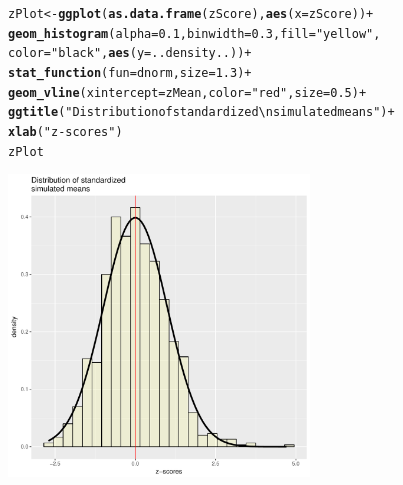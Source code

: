 \documentclass[a4paper, 12pt]{article}\usepackage[]{graphicx}\usepackage[]{color}
\makeatletter
\newcommand{\hlnum}[1]{\textcolor[rgb]{0.686,0.059,0.569}{#1}}%
\newcommand{\hlstr}[1]{\textcolor[rgb]{0.192,0.494,0.8}{#1}}%
\newcommand{\hlopt}[1]{\textcolor[rgb]{0,0,0}{#1}}%
\newcommand{\hlstd}[1]{\textcolor[rgb]{0.345,0.345,0.345}{#1}}%
\newcommand{\hlkwb}[1]{\textcolor[rgb]{0.69,0.353,0.396}{#1}}%
\newcommand{\hlkwc}[1]{\textcolor[rgb]{0.333,0.667,0.333}{#1}}%
\newcommand{\hlkwd}[1]{\textcolor[rgb]{0.737,0.353,0.396}{\textbf{#1}}}%
\newenvironment{kframe}{%
 \def\at@end@of@kframe{}%
 \ifinner\ifhmode%
  \def\at@end@of@kframe{\end{minipage}}%
  \begin{minipage}{\columnwidth}%
 \fi\fi%
 \def\FrameCommand##1{\hskip\@totalleftmargin \hskip-\fboxsep
 \colorbox{shadecolor}{##1}\hskip-\fboxsep
     \hskip-\linewidth \hskip-\@totalleftmargin \hskip\columnwidth}%
 \MakeFramed {\advance\hsize-\width
   \@totalleftmargin\z@ \linewidth\hsize
   \@setminipage}}%
 {\par\unskip\endMakeFramed%
 \at@end@of@kframe}
\newenvironment{knitrout}{}{} %
\makeatother
\begin{document}
\begin{knitrout}
\color{fgcolor}\begin{kframe}
\begin{alltt}
\hlstd{zPlot} \hlkwb{<-} \hlkwd{ggplot}\hlstd{(}\hlkwd{as.data.frame}\hlstd{(zScore),} \hlkwd{aes}\hlstd{(}\hlkwc{x} \hlstd{= zScore))} \hlopt{+}
   \hlkwd{geom_histogram}\hlstd{(}\hlkwc{alpha}\hlstd{=}\hlnum{0.1}\hlstd{,}  \hlkwc{binwidth} \hlstd{=} \hlnum{0.3}\hlstd{,} \hlkwc{fill}\hlstd{=}\hlstr{"yellow"}\hlstd{,}
                  \hlkwc{color}\hlstd{=}\hlstr{"black"}\hlstd{,} \hlkwd{aes}\hlstd{(}\hlkwc{y} \hlstd{= ..density..))} \hlopt{+}
   \hlkwd{stat_function}\hlstd{(}\hlkwc{fun} \hlstd{= dnorm,} \hlkwc{size} \hlstd{=} \hlnum{1.3}\hlstd{)} \hlopt{+}
   \hlkwd{geom_vline}\hlstd{(}\hlkwc{xintercept} \hlstd{= zMean,} \hlkwc{color}\hlstd{=}\hlstr{"red"}\hlstd{,} \hlkwc{size} \hlstd{=} \hlnum{0.5}\hlstd{)} \hlopt{+}
   \hlkwd{ggtitle}\hlstd{(}\hlstr{"Distribution of standardized \textbackslash{}nsimulated means"}\hlstd{)} \hlopt{+}
   \hlkwd{xlab}\hlstd{(}\hlstr{"z-scores"}\hlstd{)}
\hlstd{zPlot}
\end{alltt}
\end{kframe}

{\centering \includegraphics[width=8cm,height=8cm]{figure/plotZ-1} 

}



\end{knitrout}
        
\end{document}
